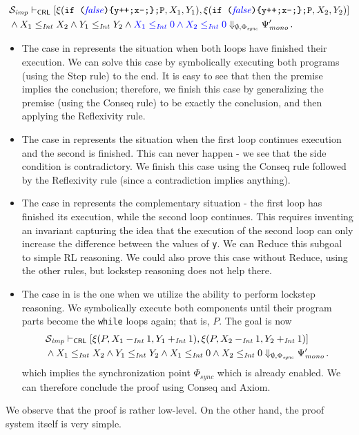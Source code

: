 \begin{equation}\label{ex:case4}
\begin{aligned}
  & \mathcal{S}_{\mathit{imp}} \vdash_{\mathsf{CRL}}
  [ \xi(\texttt{if (}{\color{blue}\mathit{false}}\texttt{)\{y++;x--;\};P}, X_1, Y_1) ,  
    \xi(\texttt{if (}{\color{blue}\mathit{false}}\texttt{)\{y++;x--;\};P}, X_2, Y_2) ] \\
  & \land X_1 \leq_{\mathit{Int}} X_2 \land Y_1 \leq_{\mathit{Int}} Y_2 \land {\color{blue} X_1 \leq_{\mathit{Int}} 0 \land X_2 \leq_{\mathit{Int}} 0 }
  \Downarrow_{\emptyset, \Phi_{\mathit{sync}}} \Psi^\prime_{\mathit{mono}} \, .
\end{aligned}
\end{equation}
\begin{itemize}
\item The case in  represents the situation when both loops have finished their execution.
We can solve this case by symbolically executing both programs (using the Step rule) to the end.
It is easy to see that then the premise implies the conclusion; therefore, we finish this case
by generalizing the premise (using the Conseq rule) to be exactly the conclusion, and then applying
the Reflexivity rule.
\item The case in  represents the situation when the first loop continues execution and the second is finished.
      This can never happen - we see that the side condition is contradictory.
      We finish this case using the Conseq rule followed by the Reflexivity rule (since a contradiction implies anything).
\item The case in  represents the complementary situation - the first loop has finished its execution,
      while the second loop continues.
      This requires inventing an invariant capturing the idea that the execution of the second loop can only increase
      the difference between the values of \texttt{y}.
      We can Reduce this subgoal to simple RL reasoning. We could also prove this case without Reduce,
      using the other rules, but lockstep reasoning does not help there.
\item The case in  is the one when we utilize the ability to perform lockstep reasoning.
      We symbolically execute both components until their program parts become the \texttt{while} loops again;
      that is, $P$.
      The goal is now
      \begin{align*}
        & \mathcal{S}_{\mathit{imp}} \vdash_{\mathsf{CRL}}
        [ \xi(P, X_1 -_{\mathit{Int}} 1, Y_1 +_{\mathit{Int}} 1 ) ,  
          \xi(P, X_2 -_{\mathit{Int}} 1, Y_2 +_{\mathit{Int}} 1) ] \\
        & \land X_1 \leq_{\mathit{Int}} X_2 \land Y_1 \leq_{\mathit{Int}} Y_2 \land {X_1 \leq_{\mathit{Int}} 0 \land X_2 \leq_{\mathit{Int}} 0 }
        \Downarrow_{\emptyset, \Phi_{\mathit{sync}}} \Psi^\prime_{\mathit{mono}} \, .
      \end{align*}
      which implies the synchronization point $\Phi_{\mathit{sync}}$ which is already enabled.
      We can therefore conclude the proof using Conseq and Axiom.
\end{itemize}
We observe that the proof is rather low-level.
On the other hand, the proof system itself is very simple.

